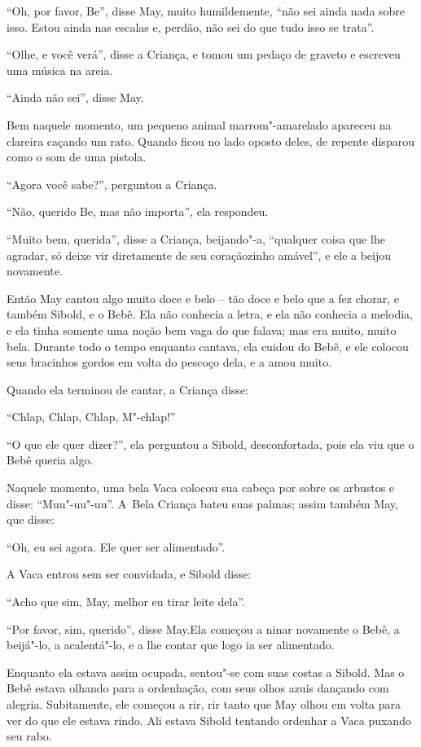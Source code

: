 ``Oh, por favor, Be'', disse May, muito humildemente, ``não sei ainda
nada sobre isso. Estou ainda nas escalas e, perdão, não sei do que tudo
isso se trata''.

``Olhe, e você verá'', disse a Criança, e tomou um pedaço de graveto e
escreveu uma música na areia.

``Ainda não sei'', disse May.

Bem naquele momento, um pequeno animal marrom"-amarelado apareceu na
clareira caçando um rato. Quando ficou no lado oposto deles, de repente
disparou como o som de uma pistola.

``Agora você sabe?'', perguntou a Criança.

``Não, querido Be, mas não importa'', ela respondeu.

``Muito bem, querida'', disse a Criança, beijando"-a, ``qualquer coisa
que lhe agradar, só deixe vir diretamente de seu coraçãozinho amável'',
e ele a beijou novamente.

Então May cantou algo muito doce e belo -- tão doce e belo que a fez
chorar, e também Sibold, e o Bebê. Ela não conhecia a letra, e ela não
conhecia a melodia, e ela tinha somente uma noção bem vaga do que
falava; mas era muito, muito bela. Durante todo o tempo enquanto
cantava, ela cuidou do Bebê, e ele colocou seus bracinhos gordos em
volta do pescoço dela, e a amou muito.

Quando ela terminou de cantar, a Criança disse:

``Chlap, Chlap, Chlap, M"-chlap!''

``O que ele quer dizer?'', ela perguntou a Sibold, desconfortada, pois
ela viu que o Bebê queria algo.

Naquele momento, uma bela Vaca colocou sua cabeça por sobre os arbustos
e disse: ``Muu"-uu"-uu''. A~Bela Criança bateu suas palmas; assim também
May, que disse:

``Oh, eu sei agora. Ele quer ser alimentado''.

A Vaca entrou sem ser convidada, e Sibold disse:

``Acho que sim, May, melhor eu tirar leite dela''.

``Por favor, sim, querido'', disse May.Ela começou a ninar novamente o
Bebê, a beijá"-lo, a acalentá"-lo, e a lhe contar que logo ia ser
alimentado.

Enquanto ela estava assim ocupada, sentou"-se com suas costas a Sibold.
Mas o Bebê estava olhando para a ordenhação, com seus olhos azuis
dançando com alegria. Subitamente, ele começou a rir, rir tanto que May
olhou em volta para ver do que ele estava rindo. Ali estava Sibold
tentando ordenhar a Vaca puxando seu rabo.

